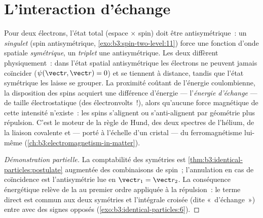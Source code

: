 \section{L'interaction d'échange}

\begin{proposition}\label{prop:b3:identical-particles:exchange-force}
Pour deux électrons, l'état total (espace $\times$ spin) doit être
antisymétrique~: un \emph{singulet} (spin antisymétrique,
\cref{exo:b3:spin-two-level:11}) force une fonction d'onde spatiale
\emph{symétrique}, un \emph{triplet} une antisymétrique. Les deux
diffèrent physiquement~: dans l'état spatial antisymétrique les
électrons ne peuvent jamais coïncider ($\psi(\vect r, \vect r) = 0$)
et se tiennent à distance, tandis que l'état symétrique les laisse se
grouper. La proximité coûtant de l'énergie coulombienne, la
disposition des spins acquiert une différence d'énergie ---
l'\emph{énergie d'échange} --- de taille électrostatique (des
électronvolts~!), alors qu'aucune force magnétique de cette intensité
n'existe~: les spins s'alignent ou s'anti-alignent par géométrie plus
répulsion. C'est le moteur de la règle de Hund, des deux spectres de
l'hélium, de la liaison covalente et --- porté à l'échelle d'un
cristal --- du ferromagnétisme lui-même
(\cref{ch:b3:electromagnetism-in-matter}).
\end{proposition}

\begin{proof}[Démonstration partielle]
La comptabilité des symétries est
\cref{thm:b3:identical-particles:postulate} augmentée des
combinaisons de spin~; l'annulation en cas de coïncidence est
l'antisymétrie lue en $\vect r_1 = \vect r_2$. La conséquence
énergétique relève de la  au premier ordre
appliquée à la répulsion~: le terme direct est commun aux deux
symétries et l'intégrale croisée (dite «~d'échange~») entre avec des
signes opposés (\cref{exo:b3:identical-particles:6}).
\end{proof}

